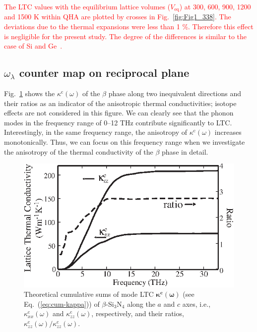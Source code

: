 \documentclass[twocolumn,amsmath,amssymb,a4paper,prb,superscriptaddress,floatfix]{revtex4-1}
\begin{document}
\textcolor{red}{The LTC values with the equilibrium lattice volumes
($V_\text{eq}$) at 300, 600, 900, 1200 and 1500 K within QHA are plotted
by crosses in Fig.~\ref{fig:Fig1_338}. The deviations due to the thermal
expansions were less than 1 \%. Therefore this effect is negligible for
the present study. The degree of the differences is similar to the case
of Si and Ge~\cite{ward-ltc}.}

\subsection{$\omega_\lambda$ counter map on reciprocal plane}


Fig.~\ref{fig:Fig2_ver2_338} shows the $\kappa^\text{c}(\omega)$ of the
$\beta$ phase along two inequivalent directions and their ratios as an
indicator of the anisotropic thermal conductivities; isotope effects are
not considered in this figure. We can clearly see that the phonon modes
in the frequency range of 0--12 THz contribute significantly to
LTC. Interestingly, in the same frequency range, the anisotropy of
$\kappa^\text{c}(\omega)$ increases monotonically. Thus, we can focus on
this frequency range when we investigate the anisotropy of the thermal
conductivity of the $\beta$ phase in detail.

\begin{figure}[ht]
 \begin{center}
  \includegraphics[width=0.90\linewidth]{Fig2.eps}
  \caption{Theoretical cumulative sums of mode LTC
  $\boldsymbol{\kappa^\text{c}(\omega)}$ (see Eq.~(\ref{eq:cum-kappa})) of
  $\beta$-Si$_3$N$_4$ along the $a$ and $c$ axes, i.e.,
  $\kappa^\text{c}_{xx}(\omega)$ and $\kappa^\text{c}_{zz}(\omega)$,
  respectively, and their ratios,
  $\kappa^\text{c}_{zz}(\omega)/\kappa^\text{c}_{zz}(\omega)$.
  \label{fig:Fig2_ver2_338} }
 \end{center}
\end{figure}
\end{document}
